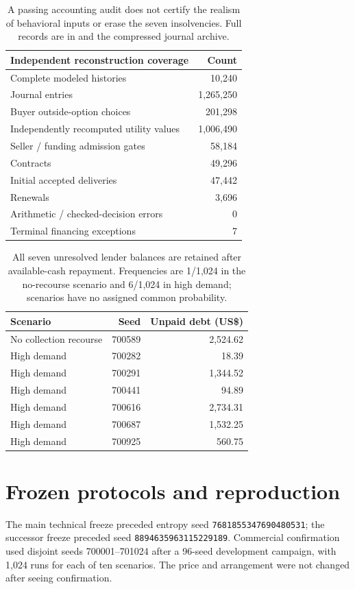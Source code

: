 \begin{table}[htbp]
\centering\small
\begin{tabular}{L{0.68\textwidth}r}
\toprule Independent reconstruction coverage & Count\\
\midrule
Complete modeled histories & 10,240\\
Journal entries & 1,265,250\\
Buyer outside-option choices & 201,298\\
Independently recomputed utility values & 1,006,490\\
Seller / funding admission gates & 58,184\\
Contracts & 49,296\\
Initial accepted deliveries & 47,442\\
Renewals & 3,696\\
Arithmetic / checked-decision errors & 0\\
Terminal financing exceptions & 7\\
\bottomrule
\end{tabular}
\caption{A passing accounting audit does not certify the realism of behavioral inputs or erase the seven insolvencies. Full records are in \protect{} and the compressed journal archive.}
\end{table}

\begin{table}[htbp]
\centering\small
\begin{tabular}{L{0.40\textwidth}rr}
\toprule Scenario & Seed & Unpaid debt (US\$)\\
\midrule
No collection recourse & 700589 & 2,524.62\\
High demand & 700282 & 18.39\\
High demand & 700291 & 1,344.52\\
High demand & 700441 & 94.89\\
High demand & 700616 & 2,734.31\\
High demand & 700687 & 1,532.25\\
High demand & 700925 & 560.75\\
\bottomrule
\end{tabular}
\caption{All seven unresolved lender balances are retained after available-cash repayment. Frequencies are 1/1,024 in the no-recourse scenario and 6/1,024 in high demand; scenarios have no assigned common probability.}
\end{table}

\section{Frozen protocols and reproduction}
The main technical freeze preceded entropy seed \texttt{7681855347690480531}; the successor freeze preceded seed \texttt{8894635963115229189}. Commercial confirmation used disjoint seeds 700001--701024 after a 96-seed development campaign, with 1,024 runs for each of ten scenarios. The price and arrangement were not changed after seeing confirmation.

